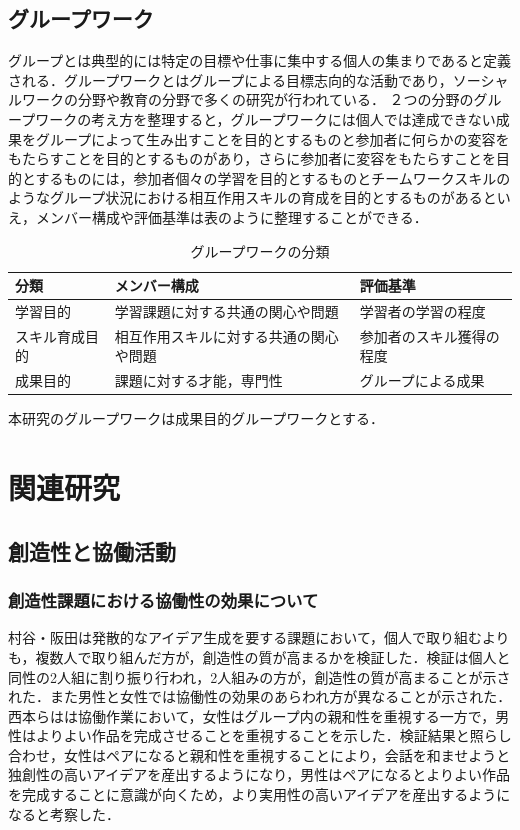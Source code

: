 \documentclass{funthesis}
\begin{document}
\section{グループワーク}
グループとは典型的には特定の目標や仕事に集中する個人の集まりであると定義される．グループワークとはグループによる目標志向的な活動であり，ソーシャルワークの分野や教育の分野で多くの研究が行われている．\cite{A13}
２つの分野のグループワークの考え方を整理すると，グループワークには個人では達成できない成果をグループによって生み出すことを目的とするものと参加者に何らかの変容をもたらすことを目的とするものがあり，さらに参加者に変容をもたらすことを目的とするものには，参加者個々の学習を目的とするものとチームワークスキルのようなグループ状況における相互作用スキルの育成を目的とするものがあるといえ，メンバー構成や評価基準は表のように整理することができる．\cite{A13}
\begin{table}[h]
\begin{center}
  \begin{tabular}{lll} \hline
    分類& メンバー構成&評価基準\tabularnewline \hline
    学習目的& 学習課題に対する共通の関心や問題 & 
    学習者の学習の程度\tabularnewline
    スキル育成目的&相互作用スキルに対する共通の関心や問題& 
    参加者のスキル獲得の程度\tabularnewline
    成果目的&課題に対する才能，専門性&
    グループによる成果\tabularnewline
    \hline
  \end{tabular}
  \caption{グループワークの分類}
  \label{groupwork}
  \end{center}
\end{table}

本研究のグループワークは成果目的グループワークとする．



\chapter{関連研究}

\section{創造性と協働活動}

\subsection{創造性課題における協働性の効果について} %
村谷・阪田\cite{A10}は発散的なアイデア生成を要する課題において，個人で取り組むよりも，複数人で取り組んだ方が，創造性の質が高まるかを検証した．検証は個人と同性の2人組に割り振り行われ，2人組みの方が，創造性の質が高まることが示された．また男性と女性では協働性の効果のあらわれ方が異なることが示された．西本らは\cite{A11}は協働作業において，女性はグループ内の親和性を重視する一方で，男性はよりよい作品を完成させることを重視することを示した．検証結果と照らし合わせ，女性はペアになると親和性を重視することにより，会話を和ませようと独創性の高いアイデアを産出するようになり，男性はペアになるとよりよい作品を完成することに意識が向くため，より実用性の高いアイデアを産出するようになると考察した．
\end{document}
